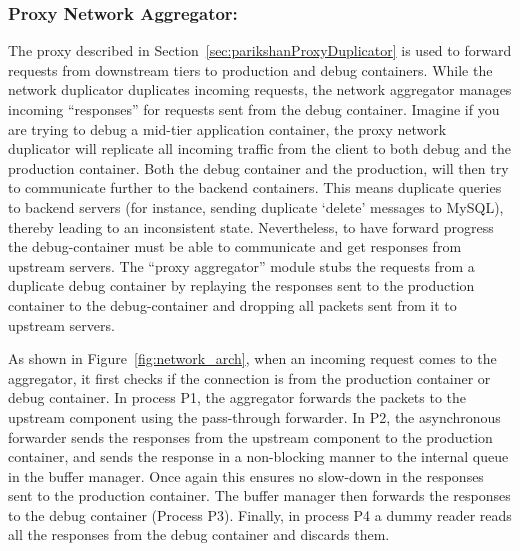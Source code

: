\subsubsection{Proxy Network Aggregator:}
\label{sec:parikshanProxyAggregator}
The proxy described in Section~\ref{sec:parikshanProxyDuplicator} is used to forward requests from downstream tiers to production and debug containers.
While the network duplicator duplicates incoming requests, the network aggregator manages incoming ``responses'' for requests sent from the debug container. 
Imagine if you are trying to debug a mid-tier application container, the proxy network duplicator will replicate all incoming traffic from the client to both debug and the production container. 
Both the debug container and the production, will then try to communicate further to the backend containers.
This means duplicate queries to backend servers (for instance, sending duplicate `delete' messages to MySQL), thereby leading to an inconsistent state.
Nevertheless, to have forward progress the debug-container must be able to communicate and get responses from upstream servers.
The ``proxy aggregator'' module stubs the requests from a duplicate debug container by replaying the responses sent to the production container to the debug-container and dropping all packets sent from it to upstream servers.

As shown in  Figure~\ref{fig:network_arch}, when an incoming request comes to the aggregator, it first checks if the connection is from the production container or debug container. 
In process P1, the aggregator forwards the packets to the upstream component using the pass-through forwarder.
In P2, the asynchronous forwarder sends the responses from the upstream component to the production container, and sends the response in a non-blocking manner to the internal queue in the buffer manager. 
Once again this ensures no slow-down in the responses sent to the production container.
The buffer manager then forwards the responses to the debug container (Process P3).
Finally, in process P4 a dummy reader reads all the responses from the debug container and discards them.


